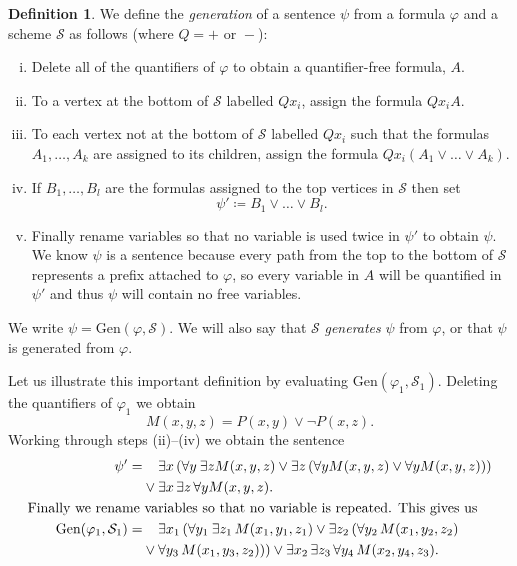 \documentclass[a4paper,12pt]{report}
\theoremstyle{definition}
\newtheorem{mydef}[lem]{Definition}
\begin{document}
\begin{mydef}
We define the \emph{generation} of a sentence $\psi$ from a formula $\varphi$ and a scheme $\mathcal{S}$ as follows (where $Q = + \mbox{ or } -$):
\begin{enumerate}[(i)]
\item Delete all of the quantifiers of $\varphi$ to obtain a quantifier-free formula, $A$.
\item To a vertex at the bottom of $\mathcal{S}$ labelled $Qx_i$, assign the formula $Qx_i A$.
\item To each vertex not at the bottom of $\mathcal{S}$ labelled $Qx_i$ such that the formulas $A_1, \ldots, A_k$ are assigned to its children, assign the formula $ Qx_i ( A_1 \lor \ldots \lor A_k)$.
\item If $B_1, \ldots, B_l$ are the formulas assigned to the top vertices in $\mathcal{S}$ then set
$$
\psi ' \coloneqq B_1 \lor \ldots \lor B_l.
$$
\item Finally rename variables so that no variable is used twice in $\psi '$ to obtain $\psi$. We know $\psi$ is a sentence because every path from the top to the bottom of $\mathcal{S}$ represents a prefix attached to $\varphi$, so every variable in $A$ will be quantified in $\psi '$ and thus $\psi$ will contain no free variables.
\end{enumerate}
We write $\psi = \mbox{Gen}(\varphi, \mathcal{S})$. We will also say that $\mathcal{S}$ \emph{generates} $\psi$ from $\varphi$, or that $\psi$ is generated from $\varphi$.
\end{mydef}

\noindent Let us illustrate this important definition by evaluating $\mbox{Gen}(\varphi_1, \mathcal{S}_1)$. Deleting the quantifiers of $\varphi_1$ we obtain
$$
M(x, y, z) = P(x, y) \lor \neg P(x, z).
$$
Working through steps (ii)--(iv) we obtain the sentence
\begin{align}
\psi' = \; \; \; \; & \exists x \, ( \forall y \: \exists z M (x, y, z) \lor  \exists z \, ( \forall y  M (x, y, z) \lor \forall y M (x, y, z))) \notag \\
\lor \: & \exists x \, \exists z \, \forall y M (x, y, z). \notag \\
\mbox{Finally we rename va} & \mbox{riables so that no variable is repeated. This gives us} \notag \\
\mbox{Gen}(\varphi_1, \mathcal{S}_1) = \; \; \; \; & \exists x_1 \, ( \forall y_1 \: \exists z_1 \, M (x_1, y_1, z_1) \lor  \exists z_2 \, ( \forall y_2 \, M (x_1, y_2, z_2) \notag \\
\lor \: & \forall y_3 \, M (x_1, y_3, z_2))) \lor \exists x_2 \, \exists z_3 \, \forall y_4 \, M (x_2, y_4, z_3). \notag
\end{align}
\end{document}

